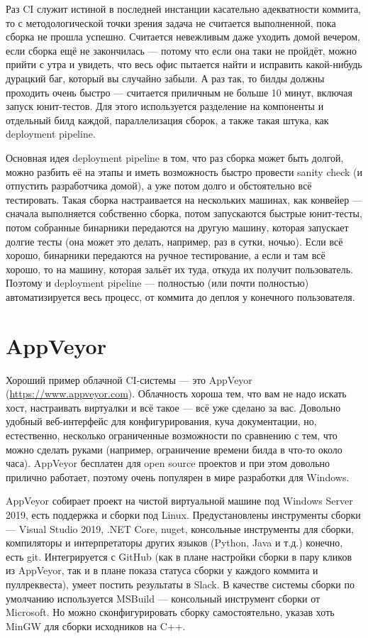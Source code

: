 \documentclass[a5paper]{article}
\begin{document}
Раз CI служит истиной в последней инстанции касательно адекватности коммита, то с методологической точки зрения задача не считается выполненной, пока сборка не прошла успешно. Считается невежливым даже уходить домой вечером, если сборка ещё не закончилась --- потому что если она таки не пройдёт, можно прийти с утра и увидеть, что весь офис пытается найти и исправить какой-нибудь дурацкий баг, который вы случайно забыли. А раз так, то билды должны проходить очень быстро --- считается приличным не больше 10 минут, включая запуск юнит-тестов. Для этого используется разделение на компоненты и отдельный билд каждой, параллелизация сборок, а также такая штука, как deployment pipeline.

Основная идея deployment pipeline в том, что раз сборка может быть долгой, можно разбить её на этапы и иметь возможность быстро провести sanity check (и отпустить разработчика домой), а уже потом долго и обстоятельно всё тестировать. Такая сборка настраивается на нескольких машинах, как конвейер --- сначала выполняется собственно сборка, потом запускаются быстрые юнит-тесты, потом собранные бинарники передаются на другую машину, которая запускает долгие тесты (она может это делать, например, раз в сутки, ночью). Если всё хорошо, бинарники передаются на ручное тестирование, а если и там всё хорошо, то на машину, которая зальёт их туда, откуда их получит пользователь. Поэтому и deployment pipeline --- полностью (или почти полностью) автоматизируется весь процесс, от коммита до деплоя у конечного пользователя.

\section{AppVeyor}

Хороший пример облачной CI-системы --- это AppVeyor (\url{https://www.appveyor.com}). Облачность хороша тем, что вам не надо искать хост, настраивать виртуалки и всё такое --- всё уже сделано за вас. Довольно удобный веб-интерфейс для конфигурирования, куча документации, но, естественно, несколько ограниченные возможности по сравнению с тем, что можно сделать руками (например, ограничение времени билда в что-то около часа). AppVeyor бесплатен для open source проектов и при этом довольно прилично работает, поэтому очень популярен в мире разработки для Windows.

AppVeyor собирает проект на чистой виртуальной машине под Windows Server 2019, есть поддержка и сборки под Linux. Предустановлены инструменты сборки --- Visual Studio 2019, .NET Core, nuget, консольные инструменты для сборки, компиляторы и интерпретаторы других языков (Python, Java и т.д.) конечно, есть git. Интегрируется с GitHub (как в плане настройки сборки в пару кликов из AppVeyor, так и в плане показа статуса сборки у каждого коммита и пуллреквеста), умеет постить результаты в Slack. В качестве системы сборки по умолчанию используется MSBuild --- консольный инструмент сборки от Microsoft. Но можно сконфигурировать сборку самостоятельно, указав хоть MinGW для сборки исходников на C++.
\end{document}
